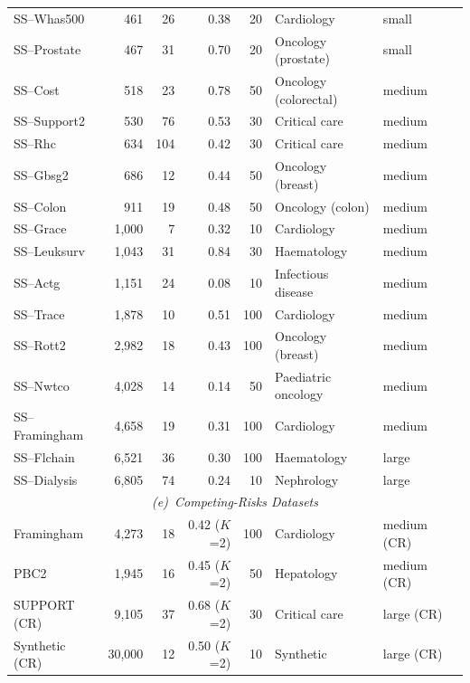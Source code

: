 \begin{longtable}{lrrrrlll}
SS--Whas500 & 461 & 26 & 0.38 & 20 & Cardiology & small & \cite{hosmer2008applied} \\
SS--Prostate & 467 & 31 & 0.70 & 20 & Oncology (prostate) & small & \cite{andrews1985data} \\
SS--Cost & 518 & 23 & 0.78 & 50 & Oncology (colorectal) & medium & \cite{goldberg2004randomized} \\
SS--Support2 & 530 & 76 & 0.53 & 30 & Critical care & medium & \cite{knaus1995support} \\
SS--Rhc & 634 & 104 & 0.42 & 30 & Critical care & medium & \cite{connors1996effectiveness} \\
SS--Gbsg2 & 686 & 12 & 0.44 & 50 & Oncology (breast) & medium & \cite{sauerbrei1999modelling} \\
SS--Colon & 911 & 19 & 0.48 & 50 & Oncology (colon) & medium & \cite{moertel1990levamisole} \\
SS--Grace & 1,000 & 7 & 0.32 & 10 & Cardiology & medium & \cite{fox2006prediction} \\
SS--Leuksurv & 1,043 & 31 & 0.84 & 30 & Haematology & medium & \cite{henderson2002modeling} \\
SS--Actg & 1,151 & 24 & 0.08 & 10 & Infectious disease & medium & \cite{hammer1997controlled} \\
SS--Trace & 1,878 & 10 & 0.51 & 100 & Cardiology & medium & \cite{kober1995clinical} \\
SS--Rott2 & 2,982 & 18 & 0.43 & 100 & Oncology (breast) & medium & \cite{royston2013external} \\
SS--Nwtco & 4,028 & 14 & 0.14 & 50 & Paediatric oncology & medium & \cite{dangelo1989treatment} \\
SS--Framingham & 4,658 & 19 & 0.31 & 100 & Cardiology & medium & \cite{dawber1951epidemiological} \\
SS--Flchain & 6,521 & 36 & 0.30 & 100 & Haematology & large & \cite{dispenzieri2012use} \\
SS--Dialysis & 6,805 & 74 & 0.24 & 10 & Nephrology & large & \cite{wolfe1999comparison} \\
\midrule
\multicolumn{8}{c}{\textit{(e)~Competing-Risks Datasets}} \\
\midrule
Framingham & 4,273 & 18 & 0.42 ($K$=2) & 100 & Cardiology & medium (CR) & \cite{dawber1951epidemiological} \\
PBC2 & 1,945 & 16 & 0.45 ($K$=2) & 50 & Hepatology & medium (CR) & \cite{murtaugh1994primary} \\
SUPPORT (CR) & 9,105 & 37 & 0.68 ($K$=2) & 30 & Critical care & large (CR) & \cite{knaus1995support} \\
Synthetic (CR) & 30,000 & 12 & 0.50 ($K$=2) & 10 & Synthetic & large (CR) &  \\
\end{longtable}